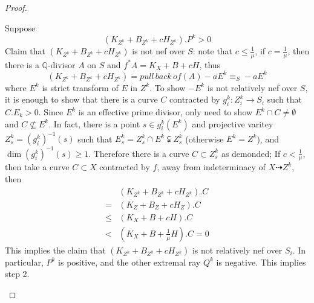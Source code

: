 \documentclass{article}
\begin{document}
\begin{proof}
\begin{enumerate}[Step 1]
		Suppose
		$$ (K_{Z^k}+B_{Z^k}+cH_{Z^k}).P^k>0 $$
		Claim that $ (K_{Z^k}+B_{Z^k}+cH_{Z^k}) $ is not nef over $ S $: note that $ c\leqslant \frac{1}{\mu} $, if $ c=\frac{1}{\mu} $, then there is a $ \mathbb{Q} $-divisor $ A $ on $ S $ and $ f^*A=K_X+B+cH $, thus 
		$$ (K_{Z^k}+B_{Z^k}+cH_{Z^k})=pull\,back\,of (A)-aE^k\equiv_S -aE^k $$
		where $ E^k $ is strict transform of $ E $ in $ Z^k $. To show $ -E^k $ is not relatively nef over $ S $, it is enough to show that there is a curve $ C $ contracted by $ g_i^k:Z^k_i\to S_i $ such that $ C.E_k>0 $.  Since $ E^k $ is an effective prime divisor, only need to show $ E^k\cap C\neq \emptyset $ and $ C\nsubseteq E^k $. In fact, there is a point $ s\in g_i^k(E^k) $ and projective varitey $ Z^k_s=(g_i^k)^{-1}(s) $ such that $ E^k_s=Z^k_s\cap E^k\subsetneqq Z^k_s $ (otherwise $ E^k=Z^k $), and $ \dim (g_i^k)^{-1}(s)\geqslant 1 $. Therefore there is a curve $ C\subset Z^k_s $ as demonded; If $ c<\frac{1}{\mu} $, then take a curve $ C\subset X $ contracted by $ f $, away from indeterminacy of $ X\dashrightarrow Z^k $, then
		\begin{equation*}
			\begin{aligned}
				&(K_{Z^k}+B_{Z^k}+cH_{Z^k}).C\\
				=&   (K_{Z}+B_{Z}+cH_{Z}).C\\
				\leqslant& (K_{X}+B+cH).C\\
				<&(K_X+B+\frac{1}{\mu}H).C=0
			\end{aligned}
		\end{equation*} 
		This implies the claim that $ (K_{Z^k}+B_{Z^k}+cH_{Z^k}) $ is not relatively nef over $ S_i $. In particular,  $ P^k $ is positive, and the other extremal ray $ Q^k $ is negative. This implies step 2. 
		

\end{enumerate}
\end{proof}
\end{document}
